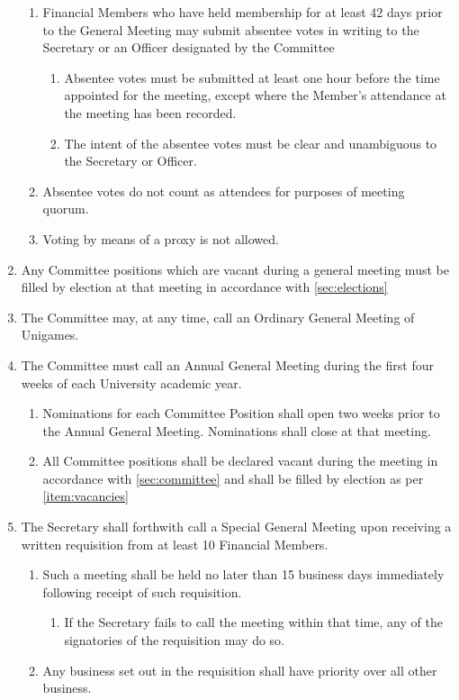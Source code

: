 \documentclass[a4paper]{article}
\begin{document}
\begin{enumerate}
        \begin{enumerate}
            \item Financial Members who have held membership for at least 42 days prior to the General Meeting may submit absentee votes in writing to the Secretary or an Officer designated by the Committee
            \begin{enumerate}
                \item Absentee votes must be submitted at least one hour before the time appointed for the meeting, except where the Member’s attendance at the meeting has been recorded.
                \item The intent of the absentee votes must be clear and unambiguous to the Secretary or Officer.
            \end{enumerate}
            \item Absentee votes do not count as attendees for purposes of meeting quorum.
            \item Voting by means of a proxy is not allowed.
        \end{enumerate}
    \item \label{item:vacancies} Any Committee positions which are vacant during a general meeting must be filled by election at that meeting in accordance with \cref{sec:elections}
    \item The Committee may, at any time, call an Ordinary General Meeting of Unigames.
    \item The Committee must call an Annual General Meeting during the first four weeks of each University academic year.
        \begin{enumerate}
            \item Nominations for each Committee Position shall open two weeks prior to the Annual General Meeting. Nominations shall close at that meeting.
            \item All Committee positions shall be declared vacant during the meeting in accordance with \cref{sec:committee} and shall be filled by election as per \cref{item:vacancies}
        \end{enumerate}
    \item The Secretary shall forthwith call a Special General Meeting upon receiving a written requisition from at least 10 Financial Members.
        \begin{enumerate}
            \item Such a meeting shall be held no later than 15 business days immediately following receipt of such requisition.
            \begin{enumerate}
                \item If the Secretary fails to call the meeting within that time, any of the signatories of the requisition may do so.
            \end{enumerate}
            \item \label{item:sgm_priority} Any business set out in the requisition shall have priority over all other business.
        \end{enumerate}
\end{enumerate}
\end{document}

